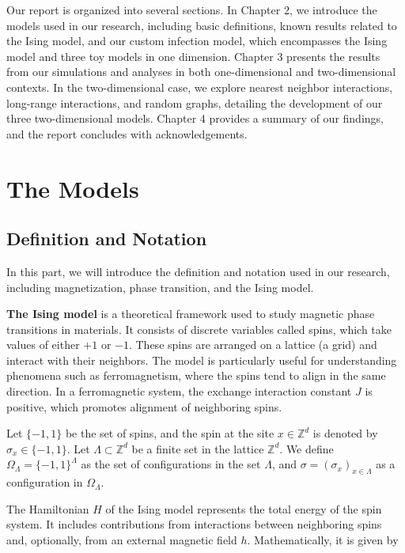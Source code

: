 \documentclass[11pt]{book}
\begin{document}
Our report is organized into several sections. In Chapter 2, we introduce the models used in our research, including basic definitions, known results related to the Ising model, and our custom infection model, which encompasses the Ising model and three toy models in one dimension. Chapter 3 presents the results from our simulations and analyses in both one-dimensional and two-dimensional contexts. In the two-dimensional case, we explore nearest neighbor interactions, long-range interactions, and random graphs, detailing the development of our three two-dimensional models. Chapter 4 provides a summary of our findings, and the report concludes with acknowledgements.

\noindent

\chapter{The Models}\label{model}

\section{Definition and Notation}\label{notation}

In this part, we will introduce the definition and notation used in our research, including magnetization, phase transition, and the Ising model.

\textbf{The Ising model} is a theoretical framework used to study magnetic phase transitions in materials. It consists of discrete variables called spins, which take values of either $+1$ or $-1$. These spins are arranged on a lattice (a grid) and interact with their neighbors. The model is particularly useful for understanding phenomena such as ferromagnetism, where the spins tend to align in the same direction. In a ferromagnetic system, the exchange interaction constant $J$ is positive, which promotes alignment of neighboring spins.

Let $\{-1,1\}$ be the set of spins, and the spin at the site $x\in \mathbb{Z}^d$ is denoted by $\sigma_x\in \{-1,1\}$. Let $\Lambda \subset \mathbb{Z}^d$ be a finite set in the lattice $\mathbb{Z}^d$. We define $\Omega_{\Lambda} = \{-1,1\}^{\Lambda}$ as the set of configurations in the set $\Lambda$, and $\sigma=(\sigma_x)_{x\in \Lambda}$ as a configuration in $\Omega_{\Lambda}$.

The Hamiltonian $H$ of the Ising model represents the total energy of the spin system. It includes contributions from interactions between neighboring spins and, optionally, from an external magnetic field $h$. Mathematically, it is given by
\end{document}
